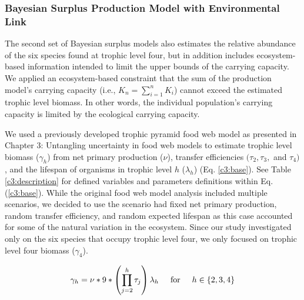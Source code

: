 \documentclass[oneside,12pt,final]{sty/ucthesis-CA2012}
\begin{document}
\begin{mainmatter}
\subsubsection{Bayesian Surplus Production Model with Environmental Link}
The second set of Bayesian surplus models also estimates the relative abundance of the six species found at trophic level four, but in addition includes ecosystem-based information intended to limit the upper bounds of the carrying capacity. We applied an ecosystem-based constraint that the sum of the production model's carrying capacity (i.e., $K_n = \sum_{i=1}^{n} K_i$) cannot exceed the estimated trophic level biomass. In other words, the individual population's carrying capacity is limited by the ecological carrying capacity.

\vspace{5mm}

We used a previously developed trophic pyramid food web model as presented in Chapter 3: Untangling uncertainty in food web models to estimate trophic level biomass ($\gamma_h$) from net primary production ($\nu$), transfer efficiencies $(\tau_2, \tau_3,$ and $\tau_4)$, and the lifespan of organisms in trophic level $h$ ($\lambda_h$) (Eq. \ref{c3:base}). See Table \ref{c3:description} for defined variables and parameters definitions within Eq. (\ref{c3:base}). While the original food web model analysis included multiple scenarios, we decided to use the scenario had fixed net primary production, random transfer efficiency, and random expected lifespan as this case accounted for some of the natural variation in the ecosystem. Since our study investigated only on the six species that occupy trophic level four, we only focused on trophic level four biomass ($\gamma_4$). 

\begin{equation} \label{c3:base}
\gamma_h = \nu * 9 * \left( \prod_{j=2}^{h} \tau_j \right) \lambda_h \hspace{5mm} \text{for} \hspace{5mm} h \in \{2, 3, 4\}
\end{equation}


\end{mainmatter}
\end{document}
